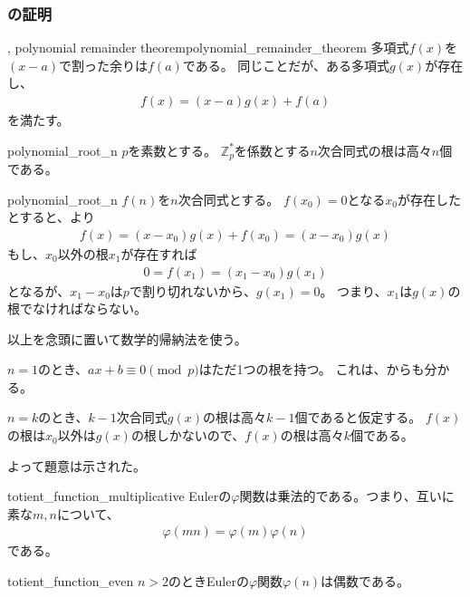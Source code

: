 \subsubsection{の証明}
\begin{Theo}{, polynomial remainder theorem}{polynomial_remainder_theorem}
多項式$f(x)$を$(x-a)$で割った余りは$f(a)$である。
同じことだが、ある多項式$g(x)$が存在し、
\begin{align*}
f(x) = (x-a)g(x) + f(a)
\end{align*}
を満たす。
\end{Theo}

\begin{Prop}{}{polynomial_root_n}
$p$を素数とする。
$\mathbb{Z}_p^*$を係数とする$n$次合同式の根は高々$n$個である。
\end{Prop}

\begin{prProof}{polynomial_root_n}
$f(n)$を$n$次合同式とする。
$f(x_0)=0$となる$x_0$が存在したとすると、より
\begin{align*}
f(x) = (x-x_0)g(x) + f(x_0) = (x-x_0)g(x)
\end{align*}
もし、$x_0$以外の根$x_1$が存在すれば
\begin{align*}
0 = f(x_1) = (x_1-x_0)g(x_1)
\end{align*}
となるが、$x_1-x_0$は$p$で割り切れないから、$g(x_1)=0$。
つまり、$x_1$は$g(x)$の根でなければならない。

以上を念頭に置いて数学的帰納法を使う。

$n=1$のとき、$ax+b\equiv0\pmod{p}$はただ1つの根を持つ。
これは、からも分かる。

$n=k$のとき、$k-1$次合同式$g(x)$の根は高々$k-1$個であると仮定する。
$f(x)$の根は$x_0$以外は$g(x)$の根しかないので、$f(x)$の根は高々$k$個である。

よって題意は示された。
\end{prProof}

\begin{Lemm}{}{totient_function_multiplicative}
Eulerの$\varphi$関数は乗法的である。つまり、互いに素な$m,n$について、
\begin{align*}
\varphi(mn) = \varphi(m)\varphi(n)
\end{align*}
である。
\end{Lemm}

\begin{Lemm}{}{totient_function_even}
$n>2$のときEulerの$\varphi$関数$\varphi(n)$は偶数である。
\end{Lemm}

